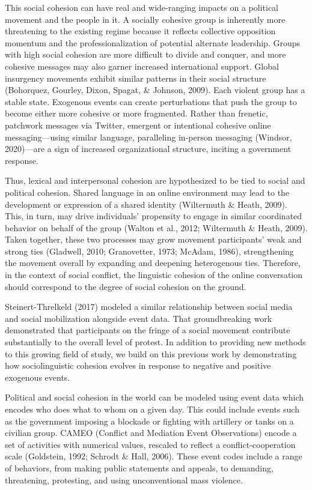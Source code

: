 \documentclass[
  english,
  man]{apa6}
\begin{document}
This social cohesion can have real and wide-ranging impacts on a political
movement and the people in it. A socially cohesive group is inherently more
threatening to the existing regime because it reflects collective opposition
momentum and the professionalization of potential alternate leadership. Groups
with high social cohesion are more difficult to divide and conquer, and more
cohesive messages may also garner increased international support. Global
insurgency movements exhibit similar patterns in their social structure
(Bohorquez, Gourley, Dixon, Spagat, \& Johnson, 2009). Each violent group has a stable state. Exogenous events
can create perturbations that push the group to become either more cohesive or
more fragmented. Rather than frenetic, patchwork messages via Twitter, emergent
or intentional cohesive online messaging---using similar language, paralleling
in-person messaging (Windsor, 2020)---are a sign of increased organizational
structure, inciting a government response.

Thus, lexical and interpersonal cohesion are hypothesized to be tied to social
and political cohesion. Shared language in an online environment may lead to the
development or expression of a shared identity (Wiltermuth \& Heath, 2009). This,
in turn, may drive individuals' propensity to engage in similar coordinated
behavior on behalf of the group (Walton et al., 2012; Wiltermuth \& Heath, 2009).
Taken together, these two processes may grow movement participants' weak and
strong ties (Gladwell, 2010; Granovetter, 1973; McAdam, 1986), strengthening the movement overall by expanding and
deepening heterogenous ties. Therefore, in the context of social conflict, the
linguistic cohesion of the online conversation should correspond to the degree
of social cohesion on the ground.

Steinert-Threlkeld (2017) modeled a similar relationship
between social media and social mobilization alongside event data. That
groundbreaking work demonstrated that participants on the fringe of a social
movement contribute substantially to the overall level of protest. In addition
to providing new methods to this growing field of study, we build on this
previous work by demonstrating how sociolinguistic cohesion evolves in
response to negative and positive exogenous events.

Political and social cohesion in the world can be modeled using event data which
encodes who does what to whom on a given day. This could include events such as
the government imposing a blockade or fighting with artillery or tanks on
a civilian group. CAMEO (Conflict and Mediation Event Observations) encode
a set of activities with numerical values, rescaled to reflect a
conflict-cooperation scale (Goldstein, 1992; Schrodt \& Hall, 2006). These event
codes include a range of behaviors, from making public statements and appeals,
to demanding, threatening, protesting, and using unconventional mass violence.
\end{document}
